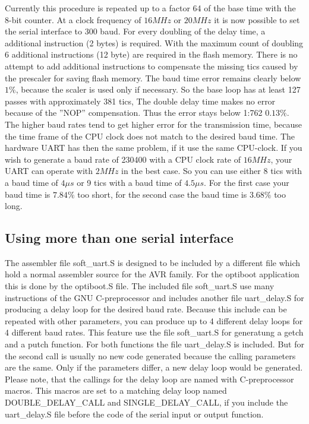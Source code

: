 Currently this procedure is repeated up to a factor 64 of the base time with the 8-bit counter.
At a clock frequency of \(16 MHz\) or \(20 MHz\) it is now possible to set the serial interface to 300 baud.
For every doubling of the delay time, a additional instruction (2 bytes) is required.
With the maximum count of doubling 6 additional instructions (12 byte) are required in the flash memory.
There is no attempt to add additional instructions to compensate the missing tics caused by
the prescaler for saving flash memory.
The baud time error remains clearly below \(1\%\), because the scaler is used only if necessary.
So the base loop has at least 127 passes with approximately 381 tics, The double delay time
makes no error because of the ''NOP'' compensation. Thus the error stays below 1:762 \(0.13\%\). 
The higher baud rates tend to get higher error for the transmission time, because
the time frame of the CPU clock does not match to the desired baud time.
The hardware UART has then the same problem, if it use the same CPU-clock.
If you wish to generate a baud rate of 230400 with a CPU clock rate of \(16 MHz\),
your UART can operate with \(2 MHz\) in the best case.
So you can use either 8 tics with a baud time of \(4\mu s\) or
9 tics with a baud time of \(4.5\mu s\).
For the first case your baud time is \(7.84\%\) too short, for the
second case the baud time is \(3.68\%\) too long.

\subsection{Using more than one serial interface}

The assembler file soft\_uart.S is designed to be included by a different file which hold
a normal assembler source for the AVR family.
For the optiboot application this is done by the optiboot.S file.
The included file soft\_uart.S use many instructions of the
GNU C-preprocessor and includes another file uart\_delay.S for producing a delay loop
for the desired baud rate. Because this include can be repeated with other parameters,
you can produce up to 4 different delay loops for 4 different baud rates.
This feature use the file soft\_uart.S for generatung a getch and a putch function.
For both functions the file uart\_delay.S is included. But for the second call is
usually no new code generated because the calling parameters are the same.
Only if the parameters differ, a new delay loop would be generated.
Please note, that the callings for the delay loop are named with C-preprocessor macros.
This macros are set to a matching delay loop named DOUBLE\_DELAY\_CALL and SINGLE\_DELAY\_CALL,
if you include the uart\_delay.S file before the code of the serial input or output function.

